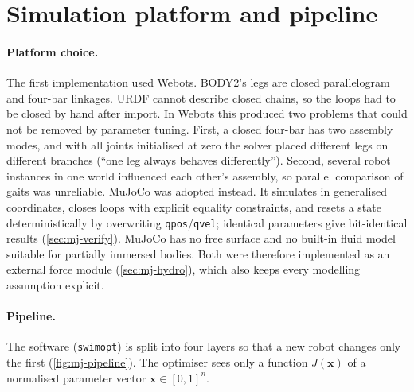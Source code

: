 \section{Simulation platform and pipeline}
\label{sec:mj-pipeline}

\paragraph{Platform choice.}
The first implementation used Webots. BODY2's legs are closed parallelogram and
four-bar linkages. URDF cannot describe closed chains, so the loops had to be
closed by hand after import. In Webots this produced two problems that could not be
removed by parameter tuning. First, a closed four-bar has two assembly modes, and
with all joints initialised at zero the solver placed different legs on different
branches (``one leg always behaves differently''). Second, several robot instances
in one world influenced each other's assembly, so parallel comparison of gaits was
unreliable. MuJoCo \cite{Todorov2012} was adopted instead. It simulates in
generalised coordinates, closes loops with explicit equality constraints, and resets
a state deterministically by overwriting \texttt{qpos}/\texttt{qvel}; identical
parameters give bit-identical results (\cref{sec:mj-verify}). MuJoCo has no free
surface and no built-in fluid model suitable for partially immersed bodies. Both
were therefore implemented as an external force module
(\cref{sec:mj-hydro}), which also keeps every modelling assumption explicit.

\paragraph{Pipeline.}
The software (\texttt{swimopt}) is split into four layers so that a new robot
changes only the first (\cref{fig:mj-pipeline}). The optimiser sees only a function
$J(\bm x)$ of a normalised parameter vector $\bm x\in[0,1]^n$.

